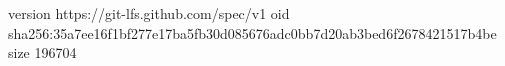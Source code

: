 version https://git-lfs.github.com/spec/v1
oid sha256:35a7ee16f1bf277e17ba5fb30d085676adc0bb7d20ab3bed6f2678421517b4be
size 196704
